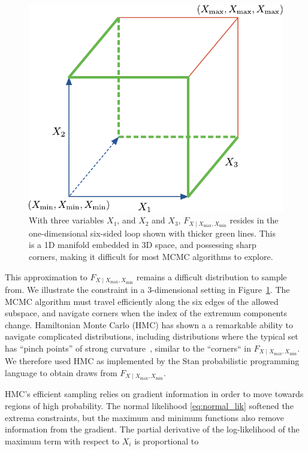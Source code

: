 \documentclass[letter]{article}
\makeatletter
\def\maxwidth{\ifdim\Gin@nat@width>\linewidth\linewidth
\else\Gin@nat@width\fi}
\let\Oldincludegraphics\includegraphics
\renewcommand{\includegraphics}[1]{\Oldincludegraphics[width=0.98\maxwidth]{#1}}
\newcommand{\Xmax}{X_{\max}}
\newcommand{\Xmin}{X_{\min}}
\newcommand{\Fcond}{F_{X \mid \Xmax,\Xmin}}
\renewcommand{\cite}[1]{\citep{#1}}
\makeatother
\begin{document}
        \begin{figure}
\centering
\includegraphics{../figures/constraints3d.pdf}
\caption{\label{fig:constraints3d}
With three variables \(X_1\), and \(X_2\) and \(X_3\), \(\Fcond\) resides in the one-dimensional six-sided loop shown with thicker green lines. This is a 1D manifold embedded in 3D space, and possessing sharp corners, making it difficult for most MCMC algorithms to explore.}
\end{figure}

This approximation to \(\Fcond\) remains a difficult distribution to sample from.
We illustrate the constraint in a 3-dimensional setting in Figure~\ref{fig:constraints3d}.
The MCMC algorithm must travel efficiently along the six edges of the allowed subspace,
and navigate corners when the index of the extremum components change.
Hamiltonian Monte Carlo (HMC) has shown a a remarkable ability to navigate complicated distributions, including distributions where the typical set has ``pinch points'' of strong
curvature~\cite{betancourt2017conceptual}, similar to the ``corners`` in \(\Fcond\).
We therefore used HMC as implemented by the Stan probabilistic programming language \cite{stancite} to obtain draws from \(\Fcond\).
    


        HMC's efficient sampling relies on gradient information in order to move towards regions of high probability.
The normal likelihood \eqref{eq:normal_lik} softened the extrema constraints,
but the maximum and minimum functions also remove information from the gradient.
The partial derivative of the log-likelihood of the maximum term with respect to \(X_i\) is proportional to
\end{document}
